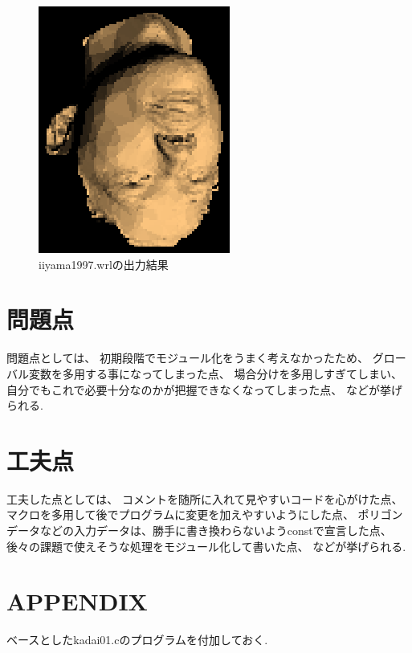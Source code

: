 \documentclass[a4j,dvipdfmx]{jsarticle}
\begin{document}
\begin{figure}[p]
  \begin{center}
        \includegraphics[clip,scale=0.5]{images/Kadai02ForIiyama1997.eps}
        \caption{iiyama1997.wrlの出力結果}
         \label{1997}
  \end{center}
\end{figure}



\section{問題点}
問題点としては、
初期段階でモジュール化をうまく考えなかったため、
グローバル変数を多用する事になってしまった点、
場合分けを多用しすぎてしまい、自分でもこれで必要十分なのかが把握できなくなってしまった点、
などが挙げられる.

\section{工夫点}
工夫した点としては、
コメントを随所に入れて見やすいコードを心がけた点、
マクロを多用して後でプログラムに変更を加えやすいようにした点、
ポリゴンデータなどの入力データは、勝手に書き換わらないようconstで宣言した点、
後々の課題で使えそうな処理をモジュール化して書いた点、
などが挙げられる.



\section{APPENDIX}
ベースとしたkadai01.cのプログラムを付加しておく.

\end{document}

